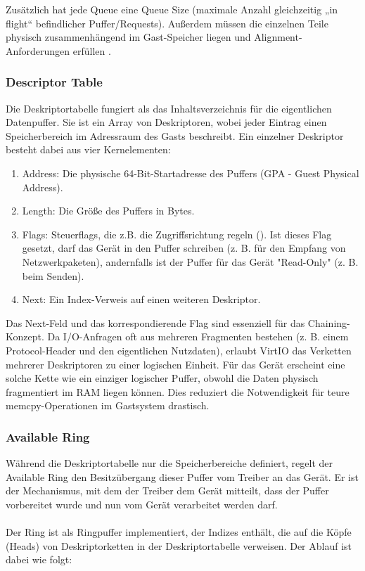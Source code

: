 Zusätzlich hat jede Queue eine Queue Size (maximale Anzahl gleichzeitig „in flight“ befindlicher Puffer/Requests). Außerdem müssen die einzelnen Teile physisch zusammenhängend im Gast-Speicher liegen und Alignment-Anforderungen erfüllen \cite{RedHatvirtqueues}.

\subsubsection{Descriptor Table}

Die Deskriptortabelle fungiert als das Inhaltsverzeichnis für die eigentlichen Datenpuffer. Sie ist ein Array von Deskriptoren, wobei jeder Eintrag einen Speicherbereich im Adressraum des Gasts beschreibt. Ein einzelner Deskriptor besteht dabei aus vier Kernelementen:

\begin{enumerate}
 \item Address: Die physische 64-Bit-Startadresse des Puffers (GPA - Guest Physical Address).
 \item Length: Die Größe des Puffers in Bytes.
 \item Flags: Steuerflags, die z.B. die Zugriffsrichtung regeln (). Ist dieses Flag gesetzt, darf das Gerät in den Puffer schreiben (z. B. für den Empfang von Netzwerkpaketen), andernfalls ist der Puffer für das Gerät "Read-Only" (z. B. beim Senden).
 \item Next: Ein Index-Verweis auf einen weiteren Deskriptor.
\end{enumerate}

Das Next-Feld und das korrespondierende Flag  sind essenziell für das Chaining-Konzept. Da I/O-Anfragen oft aus mehreren Fragmenten bestehen (z. B. einem Protocol-Header und den eigentlichen Nutzdaten), erlaubt VirtIO das Verketten mehrerer Deskriptoren zu einer logischen Einheit. Für das Gerät erscheint eine solche Kette wie ein einziger logischer Puffer, obwohl die Daten physisch fragmentiert im RAM liegen können. Dies reduziert die Notwendigkeit für teure memcpy-Operationen im Gastsystem drastisch.

\subsubsection{Available Ring}

Während die Deskriptortabelle nur die Speicherbereiche definiert, regelt der Available Ring den Besitzübergang dieser Puffer vom Treiber an das Gerät. Er ist der Mechanismus, mit dem der Treiber dem Gerät mitteilt, dass der Puffer vorbereitet wurde und nun vom Gerät verarbeitet werden darf.\\
\\
Der Ring ist als Ringpuffer implementiert, der Indizes enthält, die auf die Köpfe (Heads) von Deskriptorketten in der Deskriptortabelle verweisen. Der Ablauf ist dabei wie folgt:

